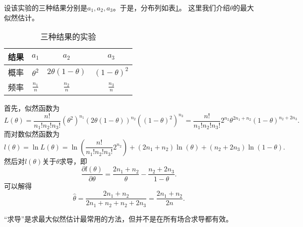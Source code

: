 \begin{example}
 设该实验的三种结果分别是$a_1,a_2,a_3$。于是，分布列如表\ref{tab:lecture18_2}。
这里我们介绍$\theta$的最大似然估计。

 
    \begin{table}[ht]
        \centering
        \caption{三种结果的实验}\label{tab:lecture18_2}
    \begin{tabular}{cccc}
    \toprule
    结果 & $a_{1}$ & $a_{2}$ & $a_{3}$\\
    \midrule
    概率 &  $\theta^{2}$&$2\theta(1-\theta)$  &$(1-\theta)^{2}$ \\
    \midrule
    频率 &  $\frac{n_{1}}{n}$& $\frac{n_{2}}{n}$ & $\frac{n_{3}}{n}$\\
    \bottomrule
    \end{tabular}
    \end{table}

首先，似然函数为
$$
L(\theta) = \frac{n!}{n_1!n_2!n_3!} (\theta^2)^{n_1} (2\theta (1-\theta))^{n_2}((1-\theta)^2)^{n_3} = \frac{n!}{n_1!n_2!n_3!} 2^{n_2}\theta^{2n_1+n_2}(1-\theta)^{n_2+2n_3}.
$$
而对数似然函数为
$$
l(\theta) = \ln L(\theta) = \ln \left(\frac{n!}{n_1!n_2!n_3!} 2^{n_2} \right) + (2n_1+n_2) \ln (\theta) + (n_2+2n_3) \ln (1-\theta).
$$
然后对$l(\theta)$关于$\theta$求导，即
$$
\frac{\partial l(\theta)}{\partial \theta} = \frac{2n_1+n_2}{\theta}  - \frac{n_2+2n_3}{1-\theta}.
$$
可以解得
$$
\hat{\theta} = \frac{2n_1 + n_2}{2n_1 + n_2 + n_2 + 2n_3} = \frac{2n_1 + n_2}{2n}.
$$
\end{example}
\begin{remark}
“求导”是求最大似然估计最常用的方法，但并不是在所有场合求导都有效。
\end{remark}

